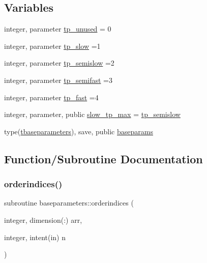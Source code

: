 \subsection*{Variables}
\begin{DoxyCompactItemize}
\item 
integer, parameter \mbox{\hyperlink{namespacebaseparameters_aa9a374c82230367604ae6b1c50ed3e3b}{tp\+\_\+unused}} = 0
\item 
integer, parameter \mbox{\hyperlink{namespacebaseparameters_aec8c4b0ea0429954337dcf5fced6abf1}{tp\+\_\+slow}} =1
\item 
integer, parameter \mbox{\hyperlink{namespacebaseparameters_a213e8b067e9d21216fbad3fbd98ec933}{tp\+\_\+semislow}} =2
\item 
integer, parameter \mbox{\hyperlink{namespacebaseparameters_a4cae4f2dfd7f3b1ed425daca03b67139}{tp\+\_\+semifast}} =3
\item 
integer, parameter \mbox{\hyperlink{namespacebaseparameters_ac1f704b0992c1c1c9f90d320ae0c4f4b}{tp\+\_\+fast}} =4
\item 
integer, parameter, public \mbox{\hyperlink{namespacebaseparameters_a1d3e10105684d9171cdfec4ccfcd331d}{slow\+\_\+tp\+\_\+max}} = \mbox{\hyperlink{namespacebaseparameters_a213e8b067e9d21216fbad3fbd98ec933}{tp\+\_\+semislow}}
\item 
type(\mbox{\hyperlink{structbaseparameters_1_1tbaseparameters}{tbaseparameters}}), save, public \mbox{\hyperlink{namespacebaseparameters_abc9ecfbbf4a5012fbc95d3fb51a1e6e3}{baseparams}}
\end{DoxyCompactItemize}


\subsection{Function/\+Subroutine Documentation}
\mbox{\label{namespacebaseparameters_a7d00d4d42d3c3abcbdbc6078fffab95f}} 
\subsubsection{\texorpdfstring{orderindices()}{orderindices()}}
{\footnotesize\ttfamily subroutine baseparameters\+::orderindices (\begin{DoxyParamCaption}\item[{integer, dimension(\+:)}]{arr,  }\item[{integer, intent(in)}]{n }\end{DoxyParamCaption})\hspace{0.3cm}{\ttfamily [private]}}



